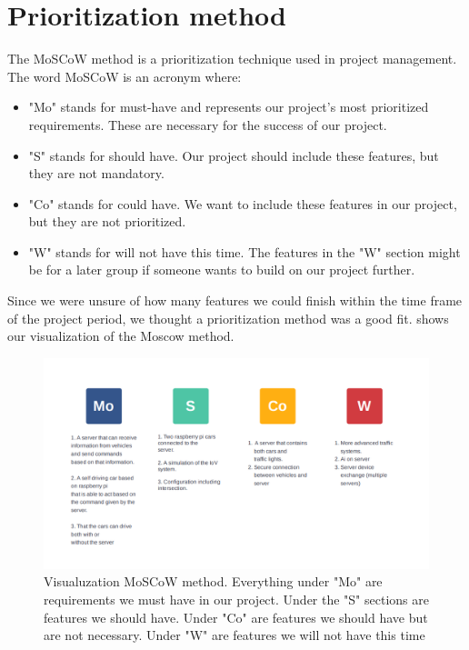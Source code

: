 \section{Prioritization method}\label{sec:moscow_method}
The MoSCoW method is a prioritization technique used in project management. The word MoSCoW is an acronym where:

\begin{itemize}
	\item "Mo" stands for must-have and represents our project's most prioritized requirements. These are necessary for the success of our project.
	\item "S" stands for should have. Our project should include these features, but they are not mandatory.
	\item "Co" stands for could have. We want to include these features in our project, but they are not prioritized.
	\item "W" stands for will not have this time. The features in the "W" section might be for a later group if someone wants to build on our project further.
\end{itemize}

Since we were unsure of how many features we could finish within the time frame of the project period, we thought a prioritization method was a good fit.  shows our visualization of the Moscow method.

\begin{figure}[h!]
	\centering
	\includegraphics[width=1\linewidth]{figures/MosCoW_method}
	\caption[MosCoW method]{Visualuzation MoSCoW method. Everything under "Mo" are requirements we must have in our project. Under the "S" sections are features we should have. Under "Co" are features we should have but are not necessary. Under "W" are features we will not have this time}
	\label{fig:moscowmethod}
\end{figure}


